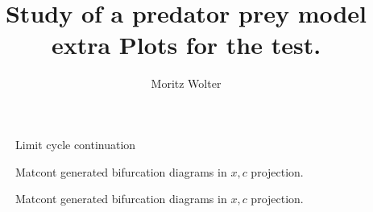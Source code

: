 




\title{Study of a predator prey model extra Plots for the test.}
\author{Moritz Wolter}


\begin{figure}[h]
\centering


\caption{Limit cycle continuation}
\end{figure}
\begin{figure}[h]
\centering


\caption{Matcont generated bifurcation diagrams in $x,c$ projection.}
\end{figure}
\begin{figure}[h]
\centering


\caption{Matcont generated bifurcation diagrams in $x,c$ projection.}
\end{figure}


